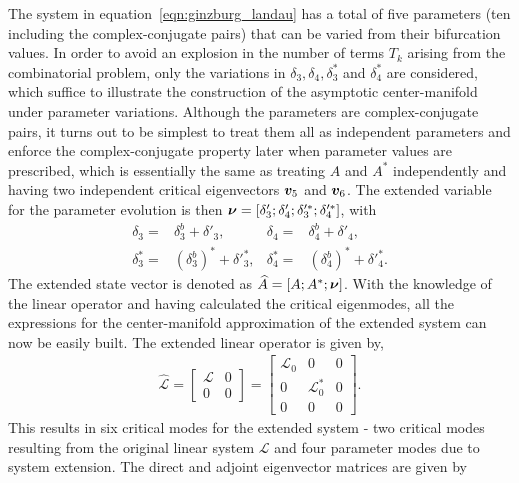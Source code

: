 The system in equation~\eqref{eqn:ginzburg_landau} has a total of five parameters (ten including the complex-conjugate pairs) that can be varied from their bifurcation values. In order to avoid an explosion in the number of terms $T_{k}$ arising from the combinatorial problem, only the variations in $\delta_{3},\delta_{4},\delta^{*}_{3}$ and $\delta^{*}_{4}$ are considered, which suffice to illustrate the construction of the asymptotic center-manifold under parameter variations. Although the parameters are complex-conjugate pairs, it turns out to be simplest to treat them all as independent parameters and enforce the complex-conjugate property later when parameter values are prescribed, which is essentially the same as treating $A$ and $A^{*}$ independently and having two independent critical eigenvectors $\boldsymbol{v}_{5}$ and $\boldsymbol{v}_{6}$. 
The extended variable for the parameter evolution is then $\boldsymbol{\nu} = [\delta'_{3};\delta'_{4};\delta'^{*}_{3};\delta'^{*}_{4}]$, with 
\begin{align}
	\delta_{3} =& \delta^{b}_{3} + \delta'_{3},& \delta_{4} =& \delta^{b}_{4} + \delta'_{4}, \nonumber \\
	\delta^{*}_{3} =& (\delta^{b}_{3})^{*} + \delta'^{*}_{3}, &\delta^{*}_{4} =& (\delta^{b}_{4})^{*} + \delta'^{*}_{4}. \nonumber
\end{align}
The extended state vector is denoted as $\widehat{A} = [A; A^{*}; \boldsymbol{\nu}]$. With the knowledge of the linear operator and having calculated the critical eigenmodes, all the expressions for the center-manifold approximation of the extended system can now be easily built. 
The extended linear operator is given by,
 \begin{align}
 	\mathcal{\widehat{L}} = \begin{bmatrix}
 		\mathcal{L} 	   & 0				 \\
		0							  & 0											
 	\end{bmatrix} = 
 	\begin{bmatrix}
 		\mathcal{L}_{0} 	   & 0											&	0 \\
 		0									  & \mathcal{L}^{*}_{0}		&   0 \\
 		0									  & 0											&  0
 	\end{bmatrix}. \nonumber
 \end{align}
This results in six critical modes for the extended system - two critical modes resulting from the original linear system $\mathcal{L}$ and four parameter modes due to system extension. The direct and adjoint eigenvector matrices are given by
